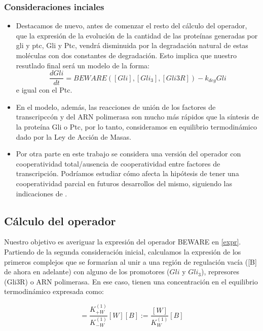 \subsubsection{Consideraciones inciales}
\begin{itemize}

\item Destacamos de nuevo, antes de comenzar el resto del cálculo del operador, que la expresión de la evolución de la cantidad de las proteínas generadas por gli y ptc, Gli y Ptc, vendrá disminuida por la degradación natural de estas moléculas con dos constantes de degradación. Esto implica que nuestro resutlado final será un modelo de la forma:
\begin{equation}
\frac{dGli}{dt}=BEWARE([Gli],[Gli_3],[Gli3R])-k_{deg}Gli
\label{expr}
\end{equation}
e igual con el Ptc.

\item En el modelo, además, las reacciones de unión de los factores de transcripccón y del ARN polimerasa son mucho más rápidos que la síntesis de la proteína Gli o Ptc, por lo tanto, consideramos en equilibrio termodinámico dado por la Ley de Acción de Masas.

\item Por otra parte en este trabajo se considera una versión del operador con cooperatividad total/ausencia de cooperatividad entre factores de transcripción. Podríamos estudiar cómo afecta la hipótesis de tener una cooperatividad parcial en futuros desarrollos del mismo, siguiendo las indicaciones de \cite{cambon1}.
	 
\end{itemize}

\subsection{Cálculo del operador}
Nuestro objetivo es averiguar la expresión del operador BEWARE en \ref{expr}.
Partiendo de la segunda consideración inicial, calculamos la expresión de los primeros complejos que se formarían al unir a una región de regulación vacía ([B] de ahora en adelante) con alguno de los promotores ($Gli$ y $Gli_3$), represores (Gli3R) o ARN polimerasa. En ese caso, tienen una concentración en el equilibrio termodinámico expresada como:

\begin{equation}
[BW]=\frac{K^{(1)}_{+W}}{K^{(1)}_{-W}}[W][B]:=\frac{[W]}{K^{(1)}_W}[B]
\end{equation}

